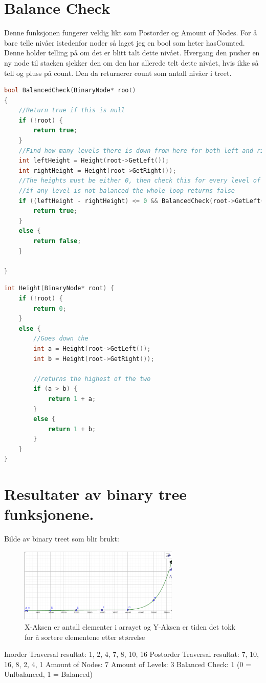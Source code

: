 \documentclass[a4paper,norsk]{article}
\begin{document}
\section{Balance Check}
Denne funksjonen fungerer veldig likt som Postorder og Amount of Nodes.
For å bare telle nivåer istedenfor noder så laget jeg en bool som heter hasCounted. Denne holder telling på om det er blitt talt dette nivået. 
Hvergang den pusher en ny node til stacken sjekker den om den har allerede telt dette nivået, hvis ikke så tell og pluss på count. 
Den da returnerer count som antall nivåer i treet.
\begin{lstlisting}[language=C++, caption={Oblig2.cpp}]
bool BalancedCheck(BinaryNode* root)
{
    //Return true if this is null
    if (!root) {
        return true;
    }
    //Find how many levels there is down from here for both left and right
    int leftHeight = Height(root->GetLeft());
    int rightHeight = Height(root->GetRight());
    //The heights must be either 0, then check this for every level of the tree
    //if any level is not balanced the whole loop returns false
    if ((leftHeight - rightHeight) <= 0 && BalancedCheck(root->GetLeft()) && BalancedCheck(root->GetRight())) {
        return true;
    }
    else {
		return false;
    }
    
}
\end{lstlisting}
\begin{lstlisting}[language=C++, caption={Oblig2.cpp}]
int Height(BinaryNode* root) {
    if (!root) {
        return 0;
    }
    else {
        //Goes down the 
        int a = Height(root->GetLeft());
        int b = Height(root->GetRight());

        //returns the highest of the two
        if (a > b) {
            return 1 + a;
        }
        else {
            return 1 + b;
        }
    }
}
\end{lstlisting}
\section{Resultater av binary tree funksjonene.} 
Bilde av binary treet som blir brukt:\newline
\begin{figure}
	\centering
	\includegraphics[width =3in]{StdSortGraph.png}
	\caption{X-Aksen er antall elementer i arrayet og Y-Aksen er tiden det tokk for å sortere elementene etter størrelse}
\end{figure}
Inorder Traversal resultat: 1, 2, 4, 7, 8, 10, 16\newline
Postorder Traversal resultat: 7, 10, 16, 8, 2, 4, 1\newline
Amount of Nodes: 7\newline
Amount of Levels: 3\newline
Balanced Check: 1 (0 = Unlbalanced, 1 = Balanced)\newline
\end{document}
